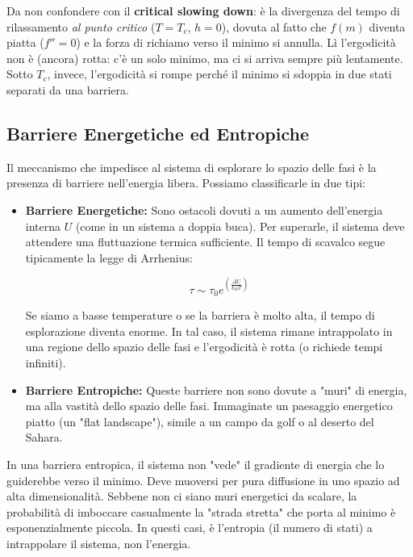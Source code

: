 \noindent Da non confondere con il \textbf{critical slowing down}: è la divergenza del tempo di rilassamento \textit{al punto critico} ($T=T_c$, $h=0$), dovuta al fatto che $f(m)$ diventa piatta ($f''=0$) e la forza di richiamo verso il minimo si annulla. Lì l'ergodicità non è (ancora) rotta: c'è un solo minimo, ma ci si arriva sempre più lentamente. Sotto $T_c$, invece, l'ergodicità si rompe perché il minimo si sdoppia in due stati separati da una barriera.

\subsection{Barriere Energetiche ed Entropiche}

Il meccanismo che impedisce al sistema di esplorare lo spazio delle fasi è la presenza di barriere nell'energia libera. Possiamo classificarle in due tipi:

\begin{itemize}
    \item \textbf{Barriere Energetiche:} Sono ostacoli dovuti a un aumento dell'energia interna $U$ (come in un sistema a doppia buca). Per superarle, il sistema deve attendere una fluttuazione termica sufficiente. Il tempo di scavalco segue tipicamente la legge di Arrhenius:
    
    \begin{equation}
    \tau \sim \tau_0 e^{\left(\frac{\Delta U}{k_B T}\right)}
    \end{equation}

    Se siamo a basse temperature o se la barriera è molto alta, il tempo di esplorazione diventa enorme. In tal caso, il sistema rimane intrappolato in una regione dello spazio delle fasi e l'ergodicità è rotta (o richiede tempi infiniti).
    
    \item \textbf{Barriere Entropiche:} Queste barriere non sono dovute a "muri" di energia, ma alla vastità dello spazio delle fasi. Immaginate un paesaggio energetico piatto (un "flat landscape"), simile a un campo da golf o al deserto del Sahara.
\end{itemize}

In una barriera entropica, il sistema non "vede" il gradiente di energia che lo guiderebbe verso il minimo. Deve muoversi per pura diffusione in uno spazio ad alta dimensionalità. Sebbene non ci siano muri energetici da scalare, la probabilità di imboccare casualmente la "strada stretta" che porta al minimo è esponenzialmente piccola. In questi casi, è l'entropia (il numero di stati) a intrappolare il sistema, non l'energia.

